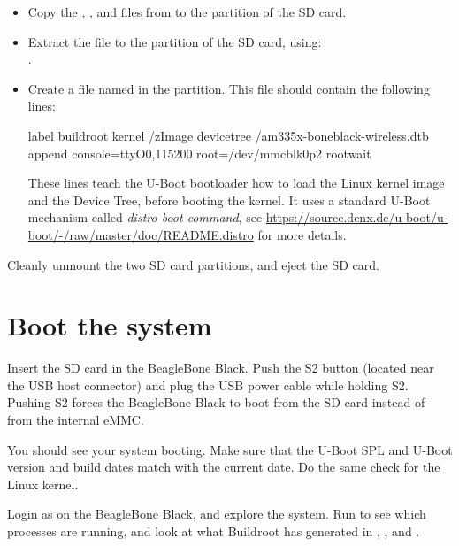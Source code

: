 \begin{itemize}

\item Copy the , ,  and
   files from
   to the  partition of the SD card.

\item Extract the  file to the 
  partition of the SD card, using:\\
  .

\item Create a file named  in the
   partition. This file should contain the following lines:

{\small
\begin{fileinput}
label buildroot
  kernel /zImage
  devicetree /am335x-boneblack-wireless.dtb
  append console=ttyO0,115200 root=/dev/mmcblk0p2 rootwait
\end{fileinput}
}

These lines teach the U-Boot bootloader how to load the Linux kernel
image and the Device Tree, before booting the kernel. It uses a
standard U-Boot mechanism called {\em distro boot command}, see
\url{https://source.denx.de/u-boot/u-boot/-/raw/master/doc/README.distro}
for more details.

\end{itemize}

Cleanly unmount the two SD card partitions, and eject the SD card.

\section{Boot the system}

Insert the SD card in the BeagleBone Black. Push the S2 button
(located near the USB host connector) and plug the USB power cable
while holding S2. Pushing S2 forces the BeagleBone Black to boot from
the SD card instead of from the internal eMMC.

You should see your system booting. Make sure that the U-Boot SPL and
U-Boot version and build dates match with the current date. Do the
same check for the Linux kernel.

Login as  on the BeagleBone Black, and explore the
system. Run  to see which processes are running, and look at
what Buildroot has generated in , , 
and .

